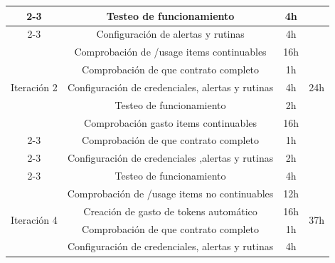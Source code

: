 \begin{table}[h!]
\begin{tabular}{|c|c|c|c|}
        \cline{2-3}
                                             & Testeo de funcionamiento                         & 4h     &                       \\
        \cline{2-3}
                                             & Configuración de alertas y rutinas               & 4h     &                       \\
        \hline
        \multirow{5}{*}{Iteración 2}         & Comprobación de /usage items continuables        & 16h    & \multirow{5}{*}{24h}  \\
        \cline{2-3}
                                             & Comprobación de que contrato completo            & 1h     &                       \\
        \cline{2-3}
                                             & Configuración de credenciales, alertas y rutinas & 4h     &                       \\
        \cline{2-3}
                                             & Testeo de funcionamiento                         & 2h     &                       \\
        \hline
        \multirow{5}{*}{Iteración 3}         & Comprobación gasto items continuables            & 16h    & \multirow{5}{*}{23h}  \\
        \cline{2-3}
                                             & Comprobación de que contrato completo            & 1h     &                       \\
        \cline{2-3}
                                             & Configuración de credenciales ,alertas y rutinas & 2h     &                       \\
        \cline{2-3}
                                             & Testeo de funcionamiento                         & 4h     &                       \\
        \hline
        \multirow{6}{*}{Iteración 4}         & Comprobación de /usage items no continuables     & 12h    & \multirow{6}{*}{37h}  \\
        \cline{2-3}
                                             & Creación de gasto de tokens automático           & 16h    &                       \\
        \cline{2-3}
                                             & Comprobación de que contrato completo            & 1h     &                       \\
        \cline{2-3}
                                             & Configuración de credenciales, alertas y rutinas & 4h     &                       \\

\end{tabular}
\end{table}
